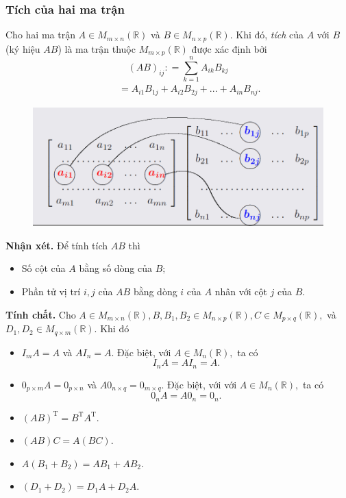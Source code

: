 \subsubsection{Tích của hai ma trận}
Cho hai ma trận $A \in M_{m \times n} \left( {\mathbb{R}} \right)$ và $B \in M_{n \times p} \left( {\mathbb{R}} \right).$ Khi đó, \textit{tích} của $A$ với $B$ (ký hiệu $AB$) là ma trận thuộc $M_{m \times p} \left( {\mathbb{R}} \right)$ được xác định bởi
$${\left( {AB} \right)_{ij}}: = \sum\limits_{k = 1}^n {{A_{ik}}{B_{kj}}} $$
$$\begin{array}{*{20}{c}}
  {\begin{array}{*{20}{c}}
  {}&{} 
\end{array}}&{ = {A_{i1}}{B_{1j}} + {A_{i2}}{B_{2j}} + ... + {A_{in}}{B_{nj}}.} 
\end{array}$$
\begin{figure}[H]
\begin{center}
\includegraphics[scale=0.8]{C1_1}
\end{center}
\end{figure}
\begin{mybox}
\textbf{Nhận xét.} Để tính tích $AB$ thì
\begin{itemize}
\item Số cột của $A$ bằng số dòng của $B;$
\item Phần tử vị trí $i, j$ của $AB$ bằng dòng $i$ của $A$ nhân với cột $j$ của $B.$
\end{itemize}
\end{mybox}
\begin{mybox}
\textbf{Tính chất.} Cho $A \in {M_{m \times n}}\left( {\mathbb{R}} \right),B,{B_1},{B_2} \in {M_{n \times p}}\left( {\mathbb{R}} \right),C \in {M_{p \times q}}\left( {\mathbb{R}} \right),$ và ${D_1},{D_2} \in {M_{q \times m}}\left( {\mathbb{R}} \right).$ Khi đó
\begin{itemize}
\item ${I_m}A = A$ và $A{I_n} = A.$ Đặc biệt, với $A \in M_n \left( {\mathbb{R}} \right),$ ta có
$$ {I_n}A = A{I_n} = A.$$
\item $0_{p \times m}A = 0_{p \times n}$ và $A0_{n \times q} = 0_{m \times q}.$ Đặc biệt, với với $A \in M_n \left( {\mathbb{R}} \right),$ ta có
$$0_n A = A0_n = 0_n.$$
\item $\left( {AB} \right) ^{\mathrm{T}} = B ^{\mathrm{T}} A ^{\mathrm{T}}.$
\item $\left( {AB} \right) C  = A \left( {BC} \right).$
\item $A \left( {B_1 + B_2} \right) = AB_1 + AB_2.$
\item $ \left( {D_1 + D_2} \right) = D_1 A + D_2 A.$
\end{itemize}
\end{mybox}

